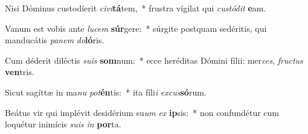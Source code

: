 \item Nisi Dóminus custodíerit \textit{ci}\textit{vi}\textbf{tá}tem,~* frustra vígilat qui \textit{cus}\textit{tó}\textit{dit} \textbf{e}am.
\item Vanum est vobis ante \textit{lu}\textit{cem} \textbf{súr}gere:~* súrgite postquam sedéritis, qui manducátis \textit{pa}\textit{nem} \textit{do}\textbf{ló}ris.
\item Cum déderit diléctis \textit{su}\textit{is} \textbf{som}num:~* ecce heréditas Dómini fílii: mer\textit{ces}, \textit{fruc}\textit{tus} \textbf{ven}tris.
\item Sicut sagíttæ in ma\textit{nu} \textit{pot}\textbf{én}tis:~* ita fíli\textit{i} \textit{ex}\textit{cus}\textbf{só}rum.
\item Beátus vir qui implévit desidérium su\textit{um} \textit{ex} \textbf{ip}sis:~* non confundétur cum loquétur inimícis \textit{su}\textit{is} \textit{in} \textbf{por}ta.
